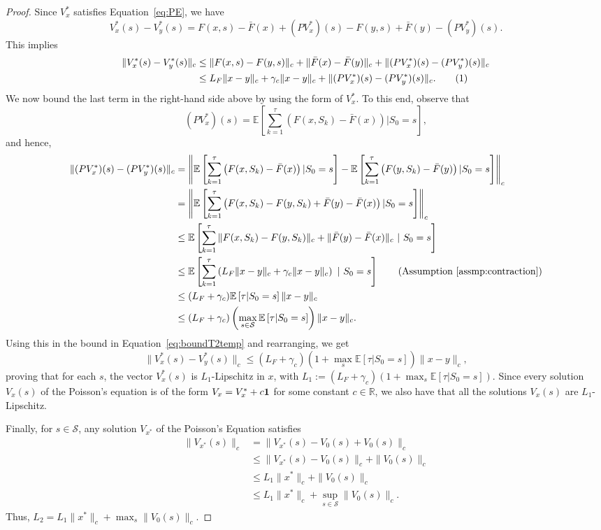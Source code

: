 \documentclass{article}
\newcommand{\numberthis}{\addtocounter{equation}{1}\tag{\theequation}}
\newcommand{\lrp}[1]{\left( #1 \right)}
\newcommand{\lrs}[1]{\left[ #1 \right]}
\newcommand{\E}[1]{\mathbb{E}\lrs{#1}}
\newcommand{\R}{\mathbb{R}}
\begin{document}
\begin{proof}
    Since $V^*_x$ satisfies Equation~\eqref{eq:PE}, we have
    \[ V^*_x(s) - V^*_y(s) = F(x,s) - \bar{F}(x) + (PV^*_x)(s) - F(y, s) + \bar{F}(y) - (PV^*_y)(s). \]
    This implies
    \begin{align*}
        \|V^*_x(s) - V^*_y(s)\|_c 
        &\le \|F(x,s) - F(y,s)\|_c + \|\bar{F}(x) - \bar{F}(y)\|_c + \| (PV^*_x)(s) - (PV^*_y)(s) \|_c\\
        &\le L_F \|x-y\|_c + \gamma_c \|x-y\|_c + \| (PV^*_x)(s) - (PV^*_y)(s) \|_c.   \numberthis\label{eq:boundT2temp}
    \end{align*}
    We now bound the last term in the right-hand side above by using the form of $V^*_x$. To this end, observe that 
    \[ (PV^*_x)(s) = \E{\sum\limits_{k=1}^{\tau} \lrp{F(x, S_k) - \bar{F}(x)} | S_0 = s}, \]
    and hence, 
    \begin{align*}
        \| (PV^*_x)(s) - (PV^*_y)(s) \|_c &= \left\|\E{\sum\limits_{k=1}^{\tau} \lrp{F(x, S_k) - \bar{F}(x)} | S_0 = s} - \E{\sum\limits_{k=1}^{\tau} \lrp{F(y, S_k) - \bar{F}(y)} | S_0 = s} \right\|_c\\
        &= \left\| \E{\sum\limits_{k=1}^{\tau} \lrp{F(x, S_k) - F(y, S_k) + \bar{F}(y) - \bar{F}(x)} | S_0 = s} \right\|_c\\
        &\le \E{\sum\limits_{k=1}^{\tau} \|F(x, S_k) - F(y, S_k)\|_c + \|\bar{F}(y) - \bar{F}(x)\|_c ~|~ S_0 = s}\\
        &\le \E{\sum\limits_{k=1}^{\tau} \lrp{L_F \|x-y\|_c + \gamma_c\|x-y\|_c} ~|~ S_0 = s} \tag{Assumption~\ref{assmp:contraction}} \\
        &\le (L_F + \gamma_c) \E{\tau|S_0 = s} \|x-y\|_c\\
        &\le (L_F + \gamma_c) \lrp{\max\limits_{s\in\mathcal S}\E{\tau|S_0 = s}} \|x-y\|_c.
    \end{align*}
    Using this in the bound in Equation~\eqref{eq:boundT2temp} and rearranging, we get
    \[ \|V^*_x(s) - V^*_y(s)\|_c \le (L_F + \gamma_c)\lrp{1+ \max_s\E{\tau| S_0 = s}} \|x-y\|_c, \]
    proving that for each $s$, the vector $V^*_x(s)$ is $L_1$-Lipschitz in $x$, with $L_1 := (L_F + \gamma_c) (1+\max_s\E{\tau | S_0 = s})$. Since every solution $V_x(s)$ of the Poisson's equation is of the form $V_x = V^*_x + c {\bf 1}$ for some constant $c\in\R$, we also have that all the solutions $V_x(s)$ are $L_1$-Lipschitz.
    
    Finally, for $s\in\mathcal S$, any solution $V_{x^*}$ of the Poisson's Equation satisfies
    \begin{align*}
        \|V_{x^*}(s)\|_c  
        &= \|V_{x^*}(s) - V_0(s) + V_0(s)\|_c\\
        &\le \|V_{x^*}(s) - V_0(s)\|_c + \|V_0(s)\|_c\\
        &\le L_1\|x^*\|_c + \|V_0(s)\|_c\\
        &\le L_1\|x^*\|_c + \sup\limits_{s\in\mathcal S}\|V_0(s)\|_c. 
    \end{align*}
    Thus, $L_2 = L_1\|x^*\|_c + \max_s \|V_0(s)\|_c$. 
\end{proof}
\end{document}
